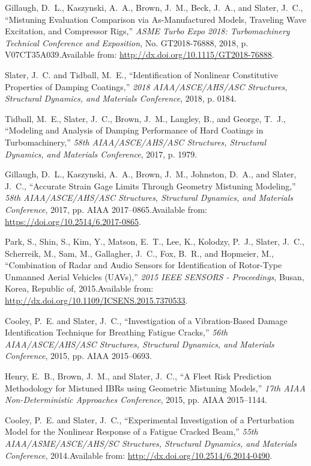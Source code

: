 Gillaugh, D.~L., Kaszynski, A.~A., Brown, J.~M., Beck, J.~A., and Slater,  J.~C., ``Mistuning Evaluation Comparison via As-Manufactured Models,  Traveling Wave Excitation, and Compressor Rigs,'' \emph{ ASME Turbo Expo 2018:  Turbomachinery Technical Conference and Exposition\/}, No. GT2018-76888,  2018, p. V07CT35A039.\newblock Available from: \url{http://dx.doi.org/10.1115/GT2018-76888}.

Slater, J.~C. and Tidball, M.~E., ``Identification of Nonlinear  Constitutive Properties of Damping Coatings,'' \emph{ 2018 AIAA/ASCE/AHS/ASC  Structures, Structural Dynamics, and Materials Conference\/}, 2018, p. 0184.

Tidball, M.~E., Slater, J.~C., Brown, J.~M., Langley, B., and George, T.~J.,  ``Modeling and Analysis of Damping Performance of Hard Coatings in  Turbomachinery,'' \emph{ 58th AIAA/ASCE/AHS/ASC Structures, Structural Dynamics,  and Materials Conference\/}, 2017, p. 1979.

Gillaugh, D.~L., Kaszynski, A.~A., Brown, J.~M., Johnston, D.~A., and Slater,  J.~C., ``Accurate Strain Gage Limits Through Geometry Mistuning  Modeling,'' \emph{ 58th AIAA/\allowbreak ASCE/\allowbreak AHS/\allowbreak ASC  Structures, Structural Dynamics, and Materials Conference\/}, 2017, pp. AIAA  2017--0865.\newblock Available from: \url{https://doi.org/10.2514/6.2017-0865}.

Park, S., Shin, S., Kim, Y., Matson, E.~T., Lee, K., Kolodzy, P.~J., Slater,  J.~C., Scherreik, M., Sam, M., Gallagher, J.~C., Fox, B.~R., and Hopmeier,  M., ``Combination of Radar and Audio Sensors for Identification of  Rotor-Type Unmanned Aerial Vehicles (UAVs),'' \emph{ 2015 IEEE SENSORS -  Proceedings\/}, Busan, Korea, Republic of, 2015.\newblock Available from: \url{http://dx.doi.org/10.1109/ICSENS.2015.7370533}.

Cooley, P.~E. and Slater, J.~C., ``Investigation of a Vibration-Based  Damage Identification Technique for Breathing Fatigue Cracks,'' \emph{ 56th  AIAA/ASCE/AHS/ASC Structures, Structural Dynamics, and Materials  Conference\/}, 2015, pp. AIAA 2015--0693.

Henry, E.~B., Brown, J.~M., and Slater, J.~C., ``A Fleet Risk Prediction  Methodology for Mistuned IBRs using Geometric Mistuning Models,'' \emph{ 17th  AIAA Non-Deterministic Approaches Conference\/}, 2015, pp. AIAA 2015--1144.

Cooley, P.~E. and Slater, J.~C., ``Experimental Investigation of a  Perturbation Model for the Nonlinear Response of a Fatigue Cracked Beam,''  \emph{ 55th AIAA/ASME/ASCE/AHS/SC Structures, Structural Dynamics, and  Materials Conference\/}, 2014.\newblock Available from: \url{http://dx.doi.org/10.2514/6.2014-0490}.


